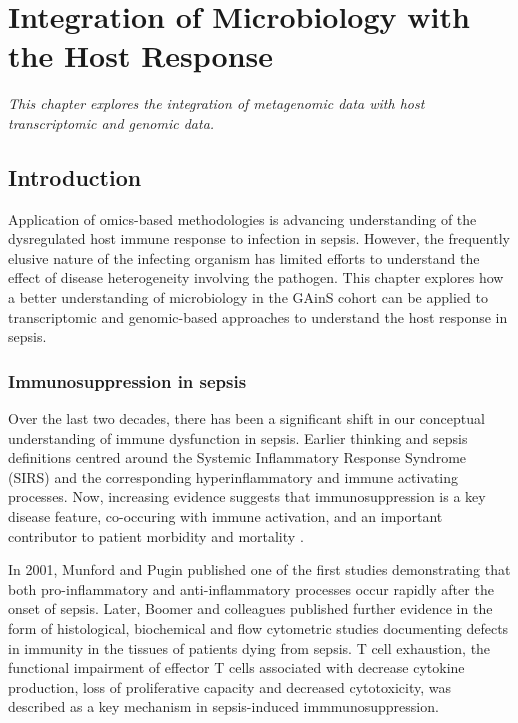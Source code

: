 \chapter{Integration of Microbiology with the Host Response}
\label{ch:Results3}
\textit{This chapter explores the integration of metagenomic data with host transcriptomic and genomic data.}

\startcontents[chapters]{\vspace{-1.4cm}}
\singlespacing
{}
\doublespacing

\section{Introduction}
Application of omics-based methodologies is advancing understanding of the dysregulated host immune response to infection in sepsis. However, the frequently elusive nature of the infecting organism has limited efforts to understand the effect of disease heterogeneity involving the pathogen. This chapter explores how a better understanding of microbiology in the GAinS cohort can be applied to transcriptomic and genomic-based approaches to understand the host response in sepsis. 

\subsection{Immunosuppression in sepsis}
Over the last two decades, there has been a significant shift in our conceptual understanding of immune dysfunction in sepsis. Earlier thinking and sepsis definitions centred around the Systemic Inflammatory Response Syndrome (SIRS) and the corresponding hyperinflammatory and immune activating processes. Now, increasing evidence suggests that immunosuppression is a key disease feature, co-occuring with immune activation, and an important contributor to patient morbidity and mortality \parencite{Daviaud2015}. 

In 2001, Munford and Pugin \parencite{Munford2001} published one of the first studies demonstrating that both pro-inflammatory and anti-inflammatory processes occur rapidly after the onset of sepsis. Later, Boomer and colleagues \parencite{Boomer2011} published further evidence in the form of histological, biochemical and flow cytometric studies documenting defects in immunity in the tissues of patients dying from sepsis. T cell exhaustion, the functional impairment of effector T cells associated with decrease cytokine production, loss of proliferative capacity and decreased cytotoxicity, was described as a key mechanism in sepsis-induced immmunosuppression. 

